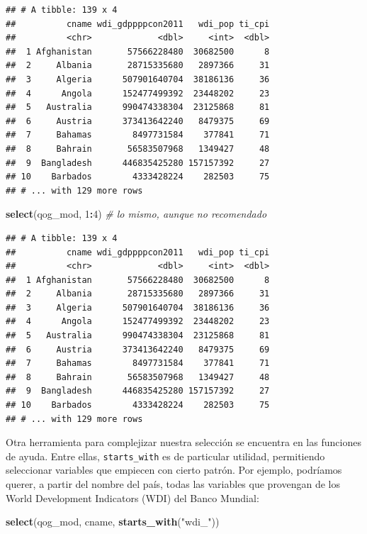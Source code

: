 \documentclass[]{book}
\newenvironment{Shaded}{\begin{snugshade}}{\end{snugshade}}
\newcommand{\KeywordTok}[1]{\textcolor[rgb]{0.13,0.29,0.53}{\textbf{#1}}}
\newcommand{\DecValTok}[1]{\textcolor[rgb]{0.00,0.00,0.81}{#1}}
\newcommand{\StringTok}[1]{\textcolor[rgb]{0.31,0.60,0.02}{#1}}
\newcommand{\CommentTok}[1]{\textcolor[rgb]{0.56,0.35,0.01}{\textit{#1}}}
\newcommand{\OperatorTok}[1]{\textcolor[rgb]{0.81,0.36,0.00}{\textbf{#1}}}
\newcommand{\NormalTok}[1]{#1}
\begin{document}
\begin{verbatim}
## # A tibble: 139 x 4
##          cname wdi_gdppppcon2011   wdi_pop ti_cpi
##          <chr>             <dbl>     <int>  <dbl>
##  1 Afghanistan       57566228480  30682500      8
##  2     Albania       28715335680   2897366     31
##  3     Algeria      507901640704  38186136     36
##  4      Angola      152477499392  23448202     23
##  5   Australia      990474338304  23125868     81
##  6     Austria      373413642240   8479375     69
##  7     Bahamas        8497731584    377841     71
##  8     Bahrain       56583507968   1349427     48
##  9  Bangladesh      446835425280 157157392     27
## 10    Barbados        4333428224    282503     75
## # ... with 129 more rows
\end{verbatim}

\begin{Shaded}
\begin{Highlighting}[]
\KeywordTok{select}\NormalTok{(qog_mod, }\DecValTok{1}\OperatorTok{:}\DecValTok{4}\NormalTok{) }\CommentTok{# lo mismo, aunque no recomendado}
\end{Highlighting}
\end{Shaded}

\begin{verbatim}
## # A tibble: 139 x 4
##          cname wdi_gdppppcon2011   wdi_pop ti_cpi
##          <chr>             <dbl>     <int>  <dbl>
##  1 Afghanistan       57566228480  30682500      8
##  2     Albania       28715335680   2897366     31
##  3     Algeria      507901640704  38186136     36
##  4      Angola      152477499392  23448202     23
##  5   Australia      990474338304  23125868     81
##  6     Austria      373413642240   8479375     69
##  7     Bahamas        8497731584    377841     71
##  8     Bahrain       56583507968   1349427     48
##  9  Bangladesh      446835425280 157157392     27
## 10    Barbados        4333428224    282503     75
## # ... with 129 more rows
\end{verbatim}

Otra herramienta para complejizar nuestra selección se encuentra en las
funciones de ayuda. Entre ellas, \texttt{starts\_with} es de particular
utilidad, permitiendo seleccionar variables que empiecen con cierto
patrón. Por ejemplo, podríamos querer, a partir del nombre del país,
todas las variables que provengan de los World Development Indicators
(WDI) del Banco Mundial:

\begin{Shaded}
\begin{Highlighting}[]
\KeywordTok{select}\NormalTok{(qog_mod, cname, }\KeywordTok{starts_with}\NormalTok{(}\StringTok{"wdi_"}\NormalTok{))}
\end{Highlighting}
\end{Shaded}
\end{document}
